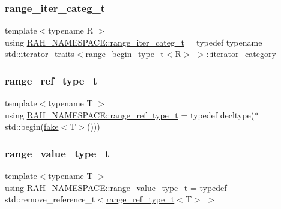 \mbox{\label{namespace_r_a_h___n_a_m_e_s_p_a_c_e_ad5ebb55d3cc13168a7da1ccdf509dc6e}} 
\subsubsection{\texorpdfstring{range\_iter\_categ\_t}{range\_iter\_categ\_t}}
{\footnotesize\ttfamily template$<$typename R $>$ \\
using \mbox{\hyperlink{namespace_r_a_h___n_a_m_e_s_p_a_c_e_ad5ebb55d3cc13168a7da1ccdf509dc6e}{R\+A\+H\+\_\+\+N\+A\+M\+E\+S\+P\+A\+C\+E\+::range\+\_\+iter\+\_\+categ\+\_\+t}} = typedef typename std\+::iterator\+\_\+traits$<$\mbox{\hyperlink{namespace_r_a_h___n_a_m_e_s_p_a_c_e_a46705781d6869d5151141f871ced1e9c}{range\+\_\+begin\+\_\+type\+\_\+t}}$<$R$>$ $>$\+::iterator\+\_\+category}

\mbox{\label{namespace_r_a_h___n_a_m_e_s_p_a_c_e_acbe6e664ee98ab43f993f56d9b9ff78c}} 
\subsubsection{\texorpdfstring{range\_ref\_type\_t}{range\_ref\_type\_t}}
{\footnotesize\ttfamily template$<$typename T $>$ \\
using \mbox{\hyperlink{namespace_r_a_h___n_a_m_e_s_p_a_c_e_acbe6e664ee98ab43f993f56d9b9ff78c}{R\+A\+H\+\_\+\+N\+A\+M\+E\+S\+P\+A\+C\+E\+::range\+\_\+ref\+\_\+type\+\_\+t}} = typedef decltype($\ast$std\+::begin(\mbox{\hyperlink{namespace_r_a_h___n_a_m_e_s_p_a_c_e_a23011f56a88d50b186adcd2ba96daecd}{fake}}$<$T$>$()))}

\mbox{\label{namespace_r_a_h___n_a_m_e_s_p_a_c_e_a18265be3353813dd9328818516e0db60}} 
\subsubsection{\texorpdfstring{range\_value\_type\_t}{range\_value\_type\_t}}
{\footnotesize\ttfamily template$<$typename T $>$ \\
using \mbox{\hyperlink{namespace_r_a_h___n_a_m_e_s_p_a_c_e_a18265be3353813dd9328818516e0db60}{R\+A\+H\+\_\+\+N\+A\+M\+E\+S\+P\+A\+C\+E\+::range\+\_\+value\+\_\+type\+\_\+t}} = typedef std\+::remove\+\_\+reference\+\_\+t$<$\mbox{\hyperlink{namespace_r_a_h___n_a_m_e_s_p_a_c_e_acbe6e664ee98ab43f993f56d9b9ff78c}{range\+\_\+ref\+\_\+type\+\_\+t}}$<$T$>$ $>$}



